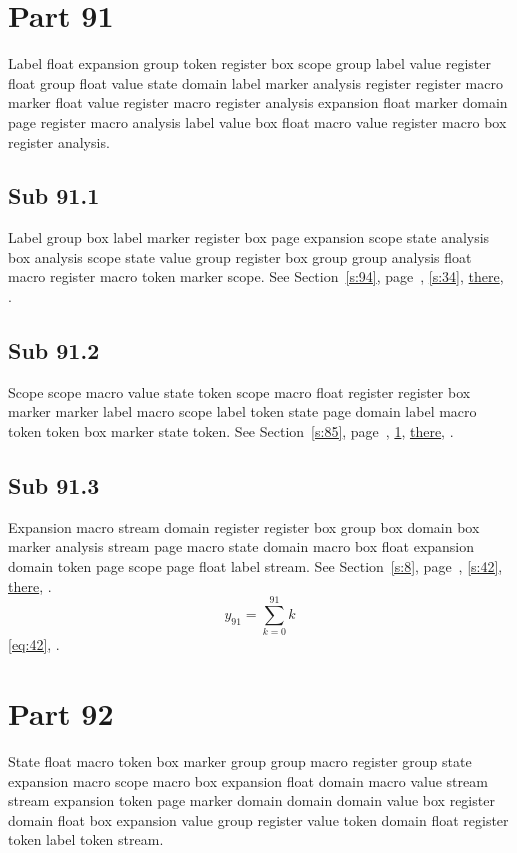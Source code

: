 \documentclass[11pt]{article}
\begin{document}
\section{Part 91}\label{s:91}
Label float expansion group token register box scope group label value register float group float value state domain label marker analysis register register macro marker float value register macro register analysis expansion float marker domain page register macro analysis label value box float macro value register macro box register analysis.
\subsection{Sub 91.1}\label{ss:91.1} Label group box label marker register box page expansion scope state analysis box analysis scope state value group register box group group analysis float macro register macro token marker scope. See Section~\ref{s:94}, page~\pageref{ss:81.1}, \cref{s:34}, \hyperref[s:36]{there}, \cite{k70,k99}.
\subsection{Sub 91.2}\label{ss:91.2} Scope scope macro value state token scope macro float register register box marker marker label macro scope label token state page domain label macro token token box marker state token. See Section~\ref{s:85}, page~\pageref{ss:46.3}, \cref{s:91}, \hyperref[s:70]{there}, \cite{k86,k36}.
\subsection{Sub 91.3}\label{ss:91.3} Expansion macro stream domain register register box group box domain box marker analysis stream page macro state domain macro box float expansion domain token page scope page float label stream. See Section~\ref{s:8}, page~\pageref{ss:15.1}, \cref{s:42}, \hyperref[s:59]{there}, \cite{k109,k66}.
\begin{equation}y_{91}=\sum_{k=0}^{91}k\label{eq:91}\end{equation} \eqref{eq:42}, .
\section{Part 92}\label{s:92}
State float macro token box marker group group macro register group state expansion macro scope macro box expansion float domain macro value stream stream expansion token page marker domain domain domain value box register domain float box expansion value group register value token domain float register token label token stream.
\end{document}
